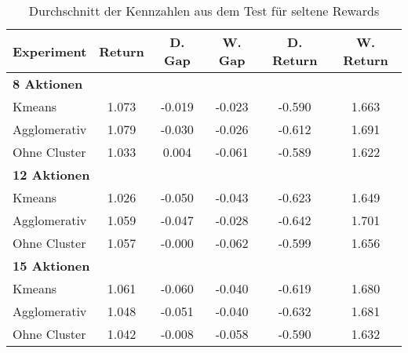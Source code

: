 \begin{table}[ht]
\centering
\caption{Durchschnitt der Kennzahlen aus dem Test für seltene Rewards}
\begin{tabular}{lccccc}
\hline
\textbf{Experiment} & \textbf{Return} & \textbf{D. Gap} & \textbf{W. Gap} & \textbf{D. Return} & \textbf{W. Return} \\
\hline
\multicolumn{6}{l}{\textbf{8 Aktionen}} \\
\hspace{1em}Kmeans & 1.073 & -0.019 & -0.023 & -0.590 & 1.663 \\
\hspace{1em}Agglomerativ & 1.079 & -0.030 & -0.026 & -0.612 & 1.691 \\
\hspace{1em}Ohne Cluster & 1.033 & 0.004 & -0.061 & -0.589 & 1.622 \\
\hline
\multicolumn{6}{l}{\textbf{12 Aktionen}} \\
\hspace{1em}Kmeans & 1.026 & -0.050 & -0.043 & -0.623 & 1.649 \\
\hspace{1em}Agglomerativ & 1.059 & -0.047 & -0.028 & -0.642 & 1.701 \\
\hspace{1em}Ohne Cluster & 1.057 & -0.000 & -0.062 & -0.599 & 1.656 \\
\hline
\multicolumn{6}{l}{\textbf{15 Aktionen}} \\
\hspace{1em}Kmeans & 1.061 & -0.060 & -0.040 & -0.619 & 1.680 \\
\hspace{1em}Agglomerativ & 1.048 & -0.051 & -0.040 & -0.632 & 1.681 \\
\hspace{1em}Ohne Cluster & 1.042 & -0.008 & -0.058 & -0.590 & 1.632 \\
\hline
\end{tabular}
\end{table}
